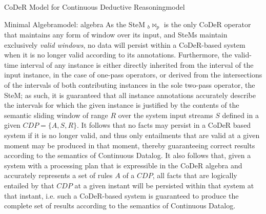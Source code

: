 \begin{nestedsection}{CoDeR Model for Continuous Deductive Reasoning}{model}
\begin{nestedsection}{Minimal Algebra}{model: algebra}
		As the SteM ${{}_b{\Join_p}}$ is the only CoDeR operator that maintains any form of window over its input, and SteMs maintain exclusively \emph{valid windows}, no data will persist within a CoDeR-based system when it is no longer valid according to its annotations.
		Furthermore, the valid-time interval of any instance is either directly inherited from the interval of the input instance, in the case of one-pass operators, or derived from the intersections of the intervals of both contributing instances in the sole two-pass operator, the SteM;
		as such, it is guaranteed that all instance annotations accurately describe the intervals for which the given instance is justified by the contents of the semantic sliding window of range $R$ over the system input streams $S$ defined in a given ${CDP = \{A,S,R\}}$.
		It follows that no facts may persist in a CoDeR based system if it is no longer valid, and thus only entailments that are valid at a given moment may be produced in that moment, thereby guaranteeing correct results according to the semantics of Continuous Datalog.
		It also follows that, given a system with a processing plan that is expressible in the CoDeR algebra and accurately represents a set of rules $A$ of a ${CDP}$, all facts that are logically entailed by that ${CDP}$ at a given instant will be persisted within that system at that instant,
		i.e. such a CoDeR-based system is guaranteed to produce the complete set of results according to the semantics of Continuous Datalog.
	\end{nestedsection}

\end{nestedsection}